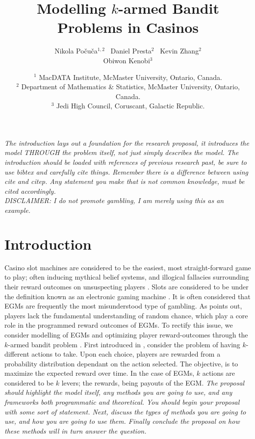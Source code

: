 \documentclass[12pt, centerh1]{article}
\title{Modelling $k$-armed Bandit Problems in Casinos  }
\author{\qquad Nikola Po\v cu\v ca$^{1,2}$ \qquad\  Daniel Presta$^{2}$ \qquad\  Kevin Zhang$^{2}$ \\ Obiwon Kenobi$^{3}$}
\date{{\small $^1$ MacDATA Institute, McMaster University, Ontario, Canada.\\[-6pt]
$^2$ Department of Mathematics \& Statistics, McMaster University, Ontario, Canada.\\[-6pt]
$^3$ Jedi High Council, Coruscant, Galactic Republic.
}
}
\begin{document}
\maketitle

\textit{The introduction lays out a foundation for the research proposal, it introduces the model THROUGH the problem itself, not just simply describes the model. The introduction should be loaded with references of previous research past, be sure to use bibtex and carefully cite things. Remember there is a difference between using cite and citep. Any statement you make that is not common knowledge, must be cited accordingly. \\ DISCLAIMER: I do not promote gambling, I am merely using this as an example.}
\newpage
\section{Introduction}
Casino slot machines are considered to be the easiest, most straight-forward game to play; often inducing mythical belief systems, and illogical fallacies surrounding their reward outcomes on unsuspecting players \citep{turner2004slot}. 
Slots are considered to be under the definition known as an electronic gaming machine \citep[EGM,][]{hamano1993electronic}. It is often considered that EGMs are frequently the most misunderstood type of gambling. As \cite{wagenaar2016paradoxes} points out, players lack the fundamental understanding of random chance, which play a core role in the programmed reward outcomes of EGMs.
To rectify this issue, we consider modelling of EGMs and optimizing player reward-outcomes through the $k$-armed bandit problem \citep{thompson1935theory}. First introduced in \cite{thompson1933likelihood}, consider the problem of having $k$-different actions to take. Upon each choice, players are rewarded from a probability distribution dependant on the action selected. The objective, is to maximize the expected reward over time. In the case of EGMs, $k$ actions are considered to be $k$ levers; the rewards, being payouts of the EGM. 
\newline\newline
\newpage
\textit{The proposal should highlight the model itself, any methods you are going to use, and any frameworks both programmatic and theoretical. You should begin your proposal with some sort of statement. Next, discuss the types of methods you are going to use, and how you are going to use them. Finally conclude the proposal on how these methods will in turn answer the question.}
\newpage
\end{document}
